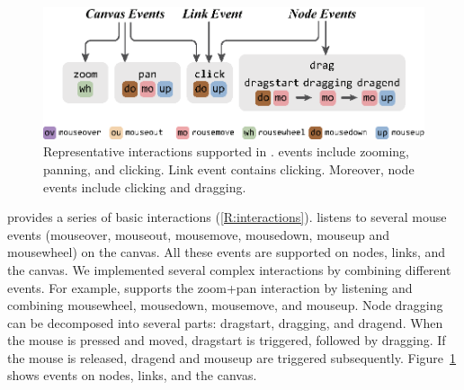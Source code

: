 \begin{figure}[htbp]
    \includegraphics[width=\linewidth]{fig/interactions.eps}
    \caption{
        Representative interactions supported in \name.  events include zooming, panning, and clicking.  Link event contains clicking. Moreover, node events include clicking and dragging.
    }
    \label{fig:interactions}
\end{figure}


     \IntMan provides a series of basic interactions (\ref{R:interactions}).
    \name listens to several mouse events (mouseover, mouseout, mousemove, mousedown, mouseup\added[id=kg]{,} and mousewheel) on the canvas. 
    All these events are supported on nodes, links, and the canvas. 
    We implemented several complex interactions by combining different events.
    For example, \name supports the zoom+pan interaction by listening and combining mousewheel, mousedown, mousemove, and mouseup. 
    Node dragging can be decomposed into several parts: dragstart, dragging, and dragend. 
    When the mouse is pressed and moved, dragstart is triggered, followed by dragging. If the mouse is released, dragend and mouseup are triggered subsequently. 
    Figure~\ref{fig:interactions} shows events on nodes, links, and the canvas.

